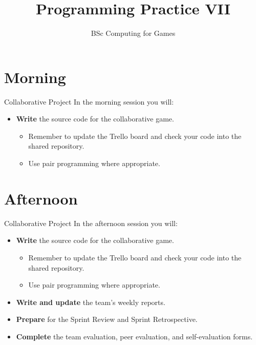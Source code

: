 \documentclass[xcolor={dvipsnames}]{beamer}\usepackage{etoolbox}\newtoggle{printable}\togglefalse{printable}
\begin{document}
\title{Programming Practice VII}   
\subtitle{BSc Computing for Games}

\frame{\titlepage} 

\part{Morning}
\frame{\partpage}

\begin{frame}{Collaborative Project}
	In the morning session you will:
	
	\begin{itemize}
		\item \textbf{Write} the source code for the collaborative game.
		\begin{itemize}
			\item Remember to update the Trello board and check your code into the shared repository.
			\item Use pair programming where appropriate.
		\end{itemize}
	\end{itemize}
\end{frame}

\part{Afternoon}
\frame{\partpage}

\begin{frame}{Collaborative Project}
	In the afternoon session you will:
	
	\begin{itemize}
		\item \textbf{Write} the source code for the collaborative game.
		\begin{itemize}
			\item Remember to update the Trello board and check your code into the shared repository.
			\item Use pair programming where appropriate.
		\end{itemize}
		\vspace{2ex}
		\item \textbf{Write and update} the team's weekly reports.
		\item\textbf{Prepare} for the Sprint Review and Sprint Retrospective.
		\item \textbf{Complete} the team evaluation, peer evaluation, and self-evaluation forms.
	\end{itemize}
\end{frame}


%
\end{document}
